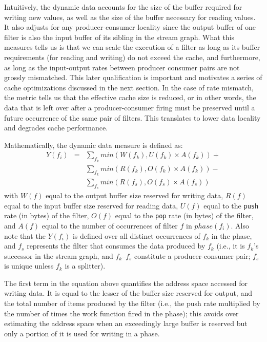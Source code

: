 Intuitively, the dynamic data accounts for the size of the buffer
required for writing new values, as well as the size of the buffer
necessary for reading values. It also adjusts for any
producer-consumer locality since the output buffer of one filter is
also the input buffer of its sibling in the stream graph. What this
measures tells us is that we can scale the execution of a filter as
long as its buffer requirements (for reading and writing) do not
exceed the cache, and furthermore, as long as the input-output rates
between producer consumer pairs are not grossly mismatched. This later
qualification is important and motivates a series of cache
optimizations discussed in the next section. In the case of rate
mismatch, the metric tells us that the effective cache size is
reduced, or in other words, the data that is left over after a
producer-consumer firing must be preserved until a future occurrence of
the same pair of filters. This translates to lower data locality and
degrades cache performance.

Mathematically, the dynamic data measure is defined as:
\begin{eqnarray}
  \nonumber
  Y(f_i) &=&\sum_{f_k} min(W(f_k), U(f_k) \times A(f_k)) + \\
  \nonumber
	   &&\sum_{f_k} min(R(f_k), O(f_k) \times A(f_k)) - \\
  \nonumber
         &&\sum_{f_s} min(R(f_s), O(f_s) \times A(f_s))
\end{eqnarray}
with $W(f)$ equal to the output buffer size reserved for writing data, $R(f)$
equal to the input buffer size reserved for reading data, $U(f)$ equal to the
{\tt push} rate (in bytes) of the filter, $O(f)$ equal to the {\tt pop} rate (in
bytes) of the filter, and $A(f)$ equal to the number of occurrences of
filter $f$ in $phase(f_i)$. Also note that the $Y(f_i)$ is defined
over all distinct occurrences of $f_k$ in the phase, and $f_s$
represents the filter that consumes the data produced by $f_k$ (i.e.,
it is $f_k$'s successor in the stream graph, and $f_k$--$f_s$
constitute a producer-consumer pair; $f_s$ is unique unless $f_k$ is a splitter).

The first term in the equation above quantifies the address space
accessed for writing data. It is  equal to the lesser of the buffer size
reserved for output, and the total number of items produced by
the filter (i.e., the push rate multiplied by the number of times the
work function fired in the phase); this avoids over estimating the
address space when an exceedingly large buffer is reserved but only a
portion of it is used for writing in a phase.

